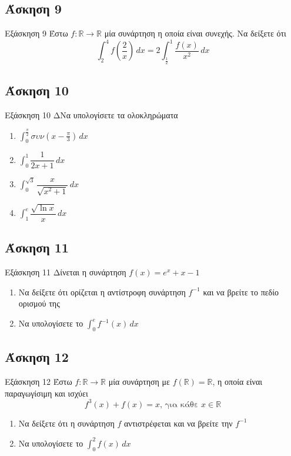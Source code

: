 \documentclass[greek]{beamer}
\begin{document}
\subsection{Άσκηση 9}
\begin{frame}[label=Άσκηση9,t]{Εξάσκηση 9}
 Έστω $f:\mathbb{R}\to\mathbb{R}$ μία συνάρτηση η οποία είναι συνεχής. Να δείξετε ότι
 $$\int_{2}^{4} f\left( \dfrac{2}{x} \right)  \,dx=2\int_{\frac{1}{2}}^{1} \dfrac{f(x)}{x^2} \,dx$$

\end{frame}

\subsection{Άσκηση 10}
\begin{frame}[label=Άσκηση10,t]{Εξάσκηση 10}
 ΔΝα υπολογίσετε τα ολοκληρώματα
 \begin{enumerate}
  \item<1-> $\int_{0}^{\frac{π}{2}} συν(x-\frac{π}{3}) \,dx$
  \item<2-> $\int_{0}^{1} \dfrac{1}{2x+1} \,dx$
  \item<3-> $\int_{0}^{\sqrt{3}} \dfrac{x}{\sqrt{x^2+1}} \,dx$
  \item<4-> $\int_{1}^{e} \dfrac{\sqrt{\ln x}}{x} \,dx$
 \end{enumerate}

\end{frame}

\subsection{Άσκηση 11}
\begin{frame}[label=Άσκηση11,,t]{Εξάσκηση 11}
 Δίνεται η συνάρτηση $f(x)=e^x+x-1$
 \begin{enumerate}
   \item<1-> Να δείξετε ότι ορίζεται η αντίστροφη συνάρτηση $f^{-1}$ και να βρείτε το πεδίο ορισμού της
   \item<2-> Να υπολογίσετε το $\int_{0}^{e} f^{-1}(x) \,dx$
 \end{enumerate}

\end{frame}

\subsection{Άσκηση 12}
\begin{frame}[label=Άσκηση12,t]{Εξάσκηση 12}
 Έστω $f:\mathbb{R}\to\mathbb{R}$ μία συνάρτηση με $f(\mathbb{R})=\mathbb{R}$, η οποία είναι παραγωγίσιμη και ισχύει
 $$f^3(x)+f(x)=x \text{, για κάθε } x\in\mathbb{R}$$
 \begin{enumerate}
   \item<1-> Να δείξετε ότι η συνάρτηση $f$ αντιστρέφεται και να βρείτε την $f^{-1}$
   \item<2-> Να υπολογίσετε το $\int_{0}^{2} f(x) \,dx$
 \end{enumerate}

\end{frame}
\end{document}
